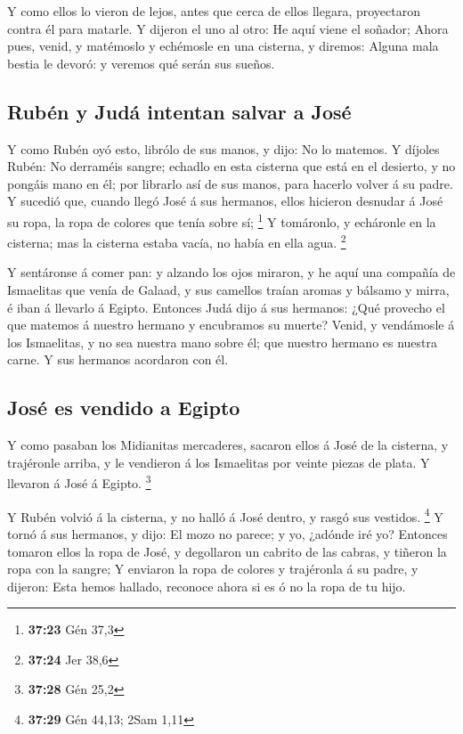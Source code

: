 Y como ellos lo vieron de lejos, antes que cerca de
ellos llegara, proyectaron contra él para matarle.  Y
dijeron el uno al otro: He aquí viene el soñador;  Ahora
pues, venid, y matémoslo y echémosle en una cisterna, y diremos: Alguna
mala bestia le devoró: y veremos qué serán sus sueños.

\hypertarget{rubuxe9n-y-juduxe1-intentan-salvar-a-josuxe9}{%
\subsection{Rubén y Judá intentan salvar a
José}\label{rubuxe9n-y-juduxe1-intentan-salvar-a-josuxe9}}

 Y como Rubén oyó esto, librólo de sus manos, y dijo: No
lo matemos.  Y díjoles Rubén: No derraméis sangre;
echadlo en esta cisterna que está en el desierto, y no pongáis mano en
él; por librarlo así de sus manos, para hacerlo volver á su padre.
 Y sucedió que, cuando llegó José á sus hermanos, ellos
hicieron desnudar á José su ropa, la ropa de colores que tenía sobre sí;
\footnote{\textbf{37:23} Gén 37,3}  Y tomáronlo, y
echáronle en la cisterna; mas la cisterna estaba vacía, no había en ella
agua. \footnote{\textbf{37:24} Jer 38,6}

 Y sentáronse á comer pan: y alzando los ojos miraron, y
he aquí una compañía de Ismaelitas que venía de Galaad, y sus camellos
traían aromas y bálsamo y mirra, é iban á llevarlo á Egipto.
 Entonces Judá dijo á sus hermanos: ¿Qué provecho el que
matemos á nuestro hermano y encubramos su muerte?  Venid,
y vendámosle á los Ismaelitas, y no sea nuestra mano sobre él; que
nuestro hermano es nuestra carne. Y sus hermanos acordaron con él.

\hypertarget{josuxe9-es-vendido-a-egipto}{%
\subsection{José es vendido a
Egipto}\label{josuxe9-es-vendido-a-egipto}}

 Y como pasaban los Midianitas mercaderes, sacaron ellos
á José de la cisterna, y trajéronle arriba, y le vendieron á los
Ismaelitas por veinte piezas de plata. Y llevaron á José á Egipto.
\footnote{\textbf{37:28} Gén 25,2}

 Y Rubén volvió á la cisterna, y no halló á José dentro,
y rasgó sus vestidos. \footnote{\textbf{37:29} Gén 44,13; 2Sam 1,11}
 Y tornó á sus hermanos, y dijo: El mozo no parece; y yo,
¿adónde iré yo?  Entonces tomaron ellos la ropa de José,
y degollaron un cabrito de las cabras, y tiñeron la ropa con la sangre;
 Y enviaron la ropa de colores y trajéronla á su padre, y
dijeron: Esta hemos hallado, reconoce ahora si es ó no la ropa de tu
hijo.

